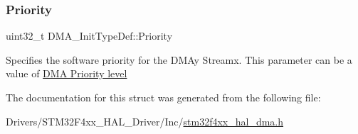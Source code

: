 \subsubsection{\texorpdfstring{Priority}{Priority}}
{\footnotesize\ttfamily uint32\+\_\+t D\+M\+A\+\_\+\+Init\+Type\+Def\+::\+Priority}

Specifies the software priority for the D\+M\+Ay Streamx. This parameter can be a value of \hyperlink{group___d_m_a___priority__level}{D\+MA Priority level} 

The documentation for this struct was generated from the following file\+:\begin{DoxyCompactItemize}
\item 
Drivers/\+S\+T\+M32\+F4xx\+\_\+\+H\+A\+L\+\_\+\+Driver/\+Inc/\hyperlink{stm32f4xx__hal__dma_8h}{stm32f4xx\+\_\+hal\+\_\+dma.\+h}\end{DoxyCompactItemize}
